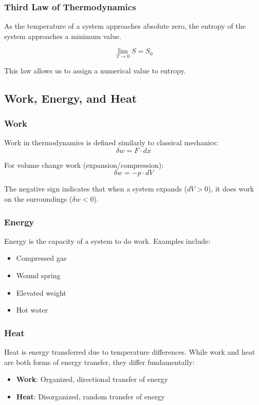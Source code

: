 \documentclass{article}
\theoremstyle{definition}
\begin{document}
\subsubsection{Third Law of Thermodynamics}

As the temperature of a system approaches absolute zero, the entropy of the system approaches a minimum value.

\[
\lim_{T \to 0} S = S_0
\]

This law allows us to assign a numerical value to entropy.

\subsection{Work, Energy, and Heat}

\subsubsection{Work}
Work in thermodynamics is defined similarly to classical mechanics:
\[
\delta w = F \cdot dx
\]

For volume change work (expansion/compression):
\[
\delta w = -p \cdot dV
\]

The negative sign indicates that when a system expands ($dV > 0$), it does work on the surroundings ($\delta w < 0$).

\subsubsection{Energy}
Energy is the capacity of a system to do work. Examples include:
\begin{itemize}
    \item Compressed gas
    \item Wound spring
    \item Elevated weight
    \item Hot water
\end{itemize}

\subsubsection{Heat}
Heat is energy transferred due to temperature differences. While work and heat are both forms of energy transfer, they differ fundamentally:
\begin{itemize}
    \item \textbf{Work}: Organized, directional transfer of energy
    \item \textbf{Heat}: Disorganized, random transfer of energy
\end{itemize}
\end{document}

